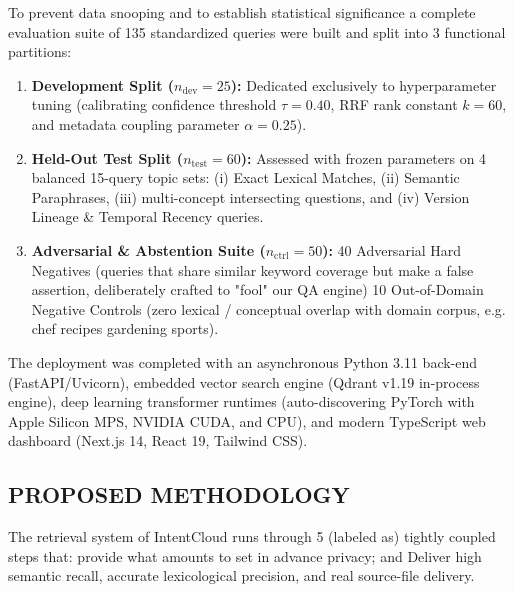 \documentclass[a4paper,12pt]{article}
\begin{document}
To prevent data snooping and to establish statistical significance a complete evaluation suite of 135 standardized queries were built and split into 3 functional partitions:
\begin{enumerate}
    \setlength{\itemsep}{1.5pt}
    \setlength{\parskip}{0pt}
    \item \textbf{Development Split ($n_{\text{dev}} = 25$):} Dedicated exclusively to hyperparameter tuning (calibrating confidence threshold $\tau = 0.40$, RRF rank constant $k=60$, and metadata coupling parameter $\alpha = 0.25$).
    \item \textbf{Held-Out Test Split ($n_{\text{test}} = 60$):} Assessed with frozen parameters on 4 balanced 15-query topic sets: (i) Exact Lexical Matches, (ii) Semantic Paraphrases, (iii) multi-concept intersecting questions, and (iv) Version Lineage \& Temporal Recency queries.
    \item \textbf{Adversarial \& Abstention Suite ($n_{\text{ctrl}} = 50$):} 40 Adversarial Hard Negatives (queries that share similar keyword coverage but make a false assertion, deliberately crafted to "fool" our QA engine) 10 Out-of-Domain Negative Controls (zero lexical / conceptual overlap with domain corpus, e.g. chef recipes gardening sports).
\end{enumerate}


The deployment was completed with an asynchronous Python 3.11 back-end (FastAPI/Uvicorn), embedded vector search engine (Qdrant v1.19 in-process engine), deep learning transformer runtimes (auto-discovering PyTorch with Apple Silicon MPS, NVIDIA CUDA, and CPU), and modern TypeScript web dashboard (Next.js 14, React 19, Tailwind CSS).

\vspace{0.4em}
\subsection{PROPOSED METHODOLOGY}

The retrieval system of IntentCloud runs through 5 (labeled as) tightly coupled steps that: provide what amounts to set in advance privacy; and Deliver high semantic recall, accurate lexicological precision, and real source-file delivery.
\end{document}
